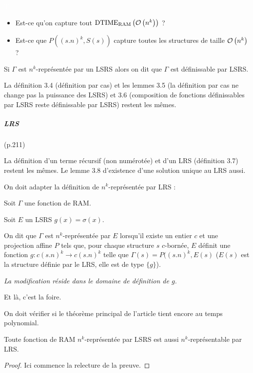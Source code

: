 \documentclass{article}
\newcommand{\dtimeram}{\text{DTIME}_{\text{RAM}}\left( \grozo{ n^k }\right)}
\begin{document}
		
		\begin{probs} \textcolor{white}{T} %
			\begin{itemize}
				\setlength{\itemsep}{-1mm}
				\item 	Est-ce qu'on capture tout $\dtimeram$ ? 
				\item 	Est-ce que $P((s.n)^k, S(s))$ capture toutes les structures de taille $\mathcal{O}\left( n^k \right)$ ?
			\end{itemize}
		\end{probs}
			
	
		Si $\Gamma$ est $n^k$-représentée par un LSRS alors on dit que $\Gamma$ est définissable par LSRS. 
		
		
		
		La définition 3.4 (définition par cas) et les lemmes 3.5 (la définition par cas ne change pas la puissance des LSRS) et 3.6 (composition de fonctions définissables par LSRS reste définissable par LSRS) restent les mêmes.
		
		
		\subparagraph{LRS} (p.211)
		
		La définition d'un terme récursif (non numérotée) et d'un LRS (définition 3.7) restent les mêmes. Le lemme 3.8 d'existence d'une solution unique au LRS aussi. 
		
		On doit adapter la définition de $n^k$-représentée par LRS : 
		
		\begin{definition}
			Soit $\Gamma$ une fonction de RAM. 
			
			Soit $E$ un LSRS $g(x) = \sigma(x)$. 
			
			On dit que $\Gamma$ est $n^k$-représentée par $E$ lorsqu'il existe un entier $c$ et une projection affine $P$ tels que, pour chaque structure $s$ $c$-bornée, $E$ définit une fonction $g : c (s.n)^k \to c (s.n)^k$ telle que $\Gamma(s) = P((s.n)^k, E(s)$ ($E(s)$ est la structure définie par le LRS, elle est de type $\{g\}$).
			
			\emph{La modification réside dans le domaine de définition de $g$.}
		\end{definition}
		
		Et là, c'est la foire.
		
		On doit vérifier si le théorème principal de l'article tient encore au temps polynomial.
		
		
		
		\begin{conj}
			Toute fonction de RAM $n^k$-représentée par LSRS est aussi $n^k$-représentable par LRS.
		\end{conj}
		
		\begin{proof}
			Ici commence la relecture de la preuve.
			
			
		\end{proof}
\end{document}
